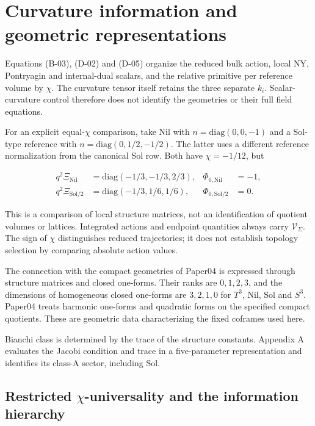 \section{Curvature information and geometric representations}

Equations (B-03), (D-02) and (D-05) organize the reduced bulk action, local NY, Pontryagin and internal-dual scalars, and the relative primitive per reference volume by $\chi$. The curvature tensor itself retains the three separate $k_i$. Scalar-curvature control therefore does not identify the geometries or their full field equations.

For an explicit equal-$\chi$ comparison, take Nil with $n=\mathrm{diag}(0,0,-1)$ and a Sol-type reference with $n=\mathrm{diag}(0,1/2,-1/2)$. The latter uses a different reference normalization from the canonical Sol row. Both have $\chi=-1/12$, but

\begin{equation}\tag{U-01}\label{eq:U-01}
\begin{aligned}
q^2\Xi_{\mathrm{Nil}}&=\mathrm{diag}(-1/3,-1/3,2/3),&\Phi_{0,\mathrm{Nil}}&=-1,\\
q^2\Xi_{\mathrm{Sol}/2}&=\mathrm{diag}(-1/3,1/6,1/6),&\Phi_{0,\mathrm{Sol}/2}&=0.
\end{aligned}
\end{equation}

This is a comparison of local structure matrices, not an identification of quotient volumes or lattices. Integrated actions and endpoint quantities always carry $\mathcal V_{\Sigma}$. The sign of $\chi$ distinguishes reduced trajectories; it does not establish topology selection by comparing absolute action values.

The connection with the compact geometries of Paper04 is expressed through structure matrices and closed one-forms. Their ranks are $0,1,2,3$, and the dimensions of homogeneous closed one-forms are $3,2,1,0$ for $T^3$, Nil, Sol and $S^3$. Paper04 treats harmonic one-forms and quadratic forms on the specified compact quotients. These are geometric data characterizing the fixed coframes used here.

Bianchi class is determined by the trace of the structure constants. Appendix A evaluates the Jacobi condition and trace in a five-parameter representation and identifies its class-A sector, including Sol.

\subsection{Restricted \texorpdfstring{$\chi$}{chi}-universality and the information hierarchy}

